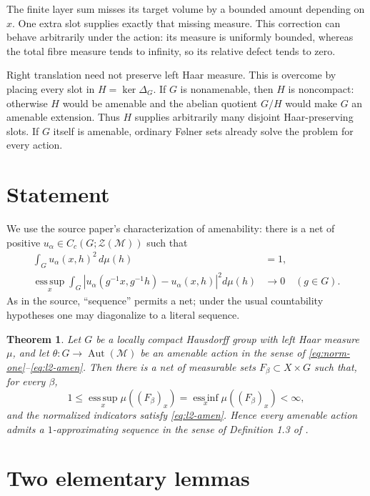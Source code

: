 \documentclass[11pt]{article}
\newtheorem{theorem}{Theorem}
\newcommand{\1}{\mathbf 1}
\newcommand{\esssup}{\operatorname*{ess\,sup}}
\newcommand{\essinf}{\operatorname*{ess\,inf}}
\begin{document}
The finite layer sum misses its target volume by a bounded amount depending on
$x$.  One extra slot supplies exactly that missing measure.  This correction
can behave arbitrarily under the action: its measure is uniformly bounded,
whereas the total fibre measure tends to infinity, so its relative defect
tends to zero.

Right translation need not preserve left Haar measure.  This is overcome by
placing every slot in $H=\ker\Delta_G$.  If $G$ is nonamenable, then $H$ is
noncompact: otherwise $H$ would be amenable and the abelian quotient $G/H$
would make $G$ an amenable extension.  Thus $H$ supplies arbitrarily many
disjoint Haar-preserving slots.  If $G$ itself is amenable, ordinary F\o lner
sets already solve the problem for every action.

\section{Statement}

We use the source paper's characterization of amenability: there is a net of
positive $u_\alpha\in C_c(G;\mathcal Z(\mathcal M))$ such that
\begin{align}
 \int_G u_\alpha(x,h)^2\,d\mu(h)&=1,\label{eq:norm-one}\\
 \esssup_x\int_G
 \left|u_\alpha(g^{-1}x,g^{-1}h)-u_\alpha(x,h)\right|^2d\mu(h)&\longrightarrow0
 \quad(g\in G).\label{eq:l2-amen}
\end{align}
As in the source, ``sequence'' permits a net; under the usual countability
hypotheses one may diagonalize to a literal sequence.

\begin{theorem}\label{thm:main}
Let $G$ be a locally compact Hausdorff group with left Haar measure $\mu$, and
let $\theta:G\to\operatorname{Aut}(\mathcal M)$ be an amenable action in the
sense of \eqref{eq:norm-one}--\eqref{eq:l2-amen}.  Then there is a net of
measurable sets $F_\beta\subset X\times G$ such that, for every $\beta$,
\[
  1\leq \esssup_x\mu((F_\beta)_x)
   =\essinf_x\mu((F_\beta)_x)<\infty,
\]
and the normalized indicators satisfy \eqref{eq:l2-amen}.  Hence every
amenable action admits a $1$-approximating sequence in the sense of Definition
1.3 of \cite{GonzalezPerez}.
\end{theorem}

\section{Two elementary lemmas}
\end{document}
